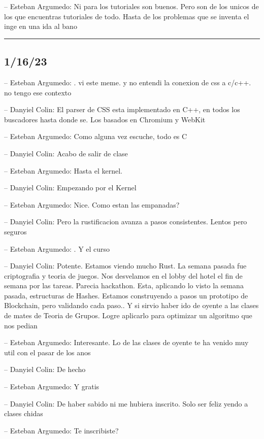 -- Esteban Argumedo: Ni para los tutoriales son buenos. Pero son de los
unicos de los que encuentras tutoriales de todo. Hasta de los problemas
que se inventa el inge en una ida al bano

\begin{center}\rule{0.5\linewidth}{0.5pt}\end{center}

\hypertarget{section-177}{%
\subsection{1/16/23}\label{section-177}}

-- Esteban Argumedo: . vi este meme. y no entendi la conexion de css a
c/c++. no tengo ese contexto

-- Danyiel Colin: El parser de CSS esta implementado en C++, en todos
los buscadores hasta donde se. Los basados en Chromium y WebKit

-- Esteban Argumedo: Como alguna vez escuche, todo es C

-- Danyiel Colin: Acabo de salir de clase

-- Esteban Argumedo: Hasta el kernel.

-- Danyiel Colin: Empezando por el Kernel

-- Esteban Argumedo: Nice. Como estan las empanadas?

-- Danyiel Colin: Pero la rustificacion avanza a pasos consistentes.
Lentos pero seguros

-- Esteban Argumedo: . Y el curso

-- Danyiel Colin: Potente. Estamos viendo mucho Rust. La semana pasada
fue criptografia y teoria de juegos. Nos desvelamos en el lobby del
hotel el fin de semana por las tareas. Parecia hackathon. Esta,
aplicando lo visto la semana pasada, estructuras de Hashes. Estamos
construyendo a pasos un prototipo de Blockchain, pero validando cada
paso.. Y si sirvio haber ido de oyente a las clases de mates de Teoria
de Grupos. Logre aplicarlo para optimizar un algoritmo que nos pedian

-- Esteban Argumedo: Interesante. Lo de las clases de oyente te ha
venido muy util con el pasar de los anos

-- Danyiel Colin: De hecho

-- Esteban Argumedo: Y gratis

-- Danyiel Colin: De haber sabido ni me hubiera inscrito. Solo ser feliz
yendo a clases chidas

-- Esteban Argumedo: Te inscribiste?

